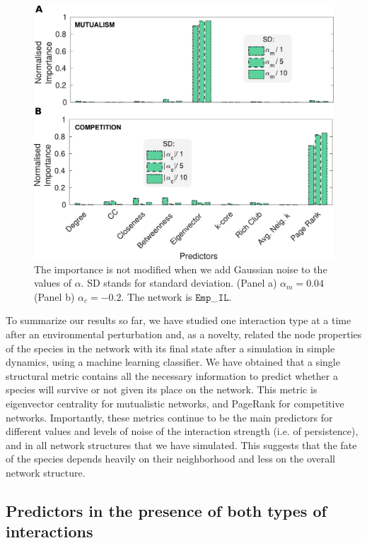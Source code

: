 \begin{figure}[t]
    \centering
    \includegraphics[width=\textwidth]{figures/chp2/fig_9.pdf}
    \caption[Importance profile with Gaussian noise]{The importance is not modified when we add Gaussian noise to the values of $\alpha$. SD stands for standard deviation. (Panel a) $\alpha_m = 0.04$ (Panel b) $\alpha_c = -0.2$. The network is $\texttt{Emp}$\_$\texttt{IL}$. }
    \label{chp2:fig:9}
\end{figure} 

 To summarize our results so far, we have studied one interaction type at a time after an environmental perturbation and, as a novelty, related the node properties of the species in the network with its final state after a simulation in simple dynamics, using a machine learning classifier. We have obtained that a single structural metric contains all the necessary information to predict whether a species will survive or not given its place on the network. This metric is eigenvector centrality for mutualistic networks, and PageRank for competitive networks. Importantly, these metrics continue to be the main predictors for different values and levels of noise of the interaction strength (i.e. of  persistence), and in all network structures that we have simulated. This suggests that the fate of the species depends heavily on their neighborhood and less on the overall network structure.
 
\subsection{Predictors in the presence of both types of interactions}\label{chp:2:3:4}

